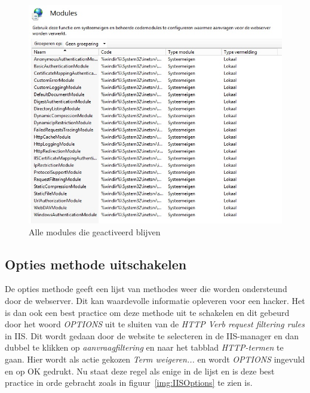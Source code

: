 \documentclass[pdftex,a4paper,12pt]{report}
\begin{document}
\begin{figure}[H]
\begin{center}
\includegraphics[scale=0.60]{img/IIS_Modules}
\end{center}
\caption{Alle modules die geactiveerd blijven}
\label{img:IISModules}
\end{figure}

\subsection{Opties methode uitschakelen}
De opties methode geeft een lijst van methodes weer die worden ondersteund door de webserver. Dit kan waardevolle informatie opleveren voor een hacker. Het is dan ook een best practice om deze methode uit te schakelen en dit gebeurd door het woord \textit{OPTIONS} uit te sluiten van de \textit{HTTP Verb request filtering rules} in IIS. Dit wordt gedaan door de website te selecteren in de IIS-manager en dan dubbel te klikken op \textit{aanvraagfiltering} en naar het tabblad \textit{HTTP-termen} te gaan. Hier wordt als actie gekozen \textit{Term weigeren...} en wordt \textit{OPTIONS} ingevuld en op OK gedrukt. Nu staat deze regel als enige in de lijst en is deze best practice in orde gebracht zoals in figuur~\ref{img:IISOptions} te zien is. \citep{Darmanin2014}
\end{document}
